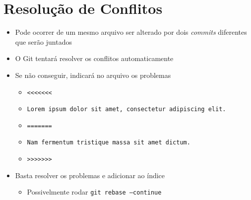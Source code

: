\documentclass{beamer}
\newenvironment{slide}{\begin{frame}{\insertsection}}{\end{frame}}
\begin{document}
\section{Resolução de Conflitos}
\begin{slide}
    \begin{itemize}
        \item Pode ocorrer de um mesmo arquivo ser alterado por dois
            \emph{commits} diferentes que serão juntados
        \pause
        \item O Git tentará resolver os conflitos automaticamente
        \pause
        \item Se não conseguir, indicará no arquivo os problemas
        \begin{itemize}
            \pause
            \item \texttt{<<<<<<<}
            \item \texttt{Lorem ipsum dolor sit amet, consectetur adipiscing
                elit.}
            \item \texttt{=======}
            \item \texttt{Nam fermentum tristique massa sit amet dictum.}
            \item \texttt{>>>>>>>}
        \end{itemize}
        \pause
        \item Basta resolver os problemas e adicionar ao índice
        \begin{itemize}
            \pause
            \item Possivelmente rodar \texttt{git rebase --continue}
        \end{itemize}
    \end{itemize}
\end{slide}
\end{document}
